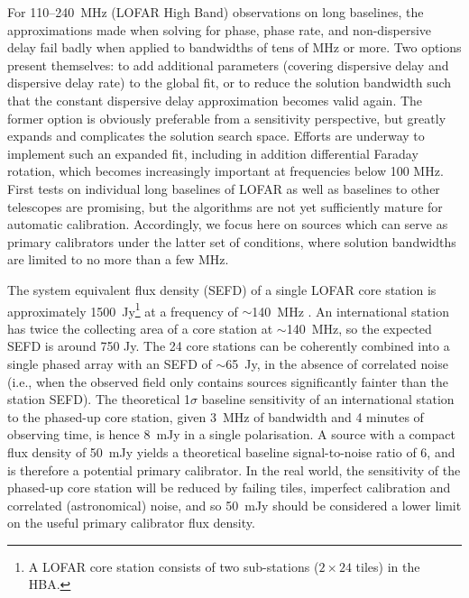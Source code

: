 \documentclass[graybox]{svmult}
\begin{document}
For 110--240~MHz (LOFAR High Band) observations on long baselines, the
approximations made when solving for phase, phase rate, and non-dispersive delay
fail badly when applied to bandwidths of tens of MHz or more.  Two options
present themselves: to add additional parameters (covering dispersive delay and
dispersive delay rate) to the global fit, or to reduce the solution bandwidth
such that the constant dispersive delay approximation becomes valid again.  The
former option is obviously preferable from a sensitivity perspective, but
greatly expands and complicates the solution search space.  Efforts are underway
to implement such an expanded fit, including in addition differential Faraday
rotation, which becomes increasingly important at frequencies below 100 MHz.
First tests on individual long baselines of LOFAR as well as baselines to other
telescopes are promising, but the algorithms are not yet sufficiently mature for
automatic calibration.  Accordingly, we focus here on sources which can serve as
primary calibrators under the latter set of conditions, where solution
bandwidths are limited to no more than a few MHz.

The system equivalent flux density (SEFD) of a single LOFAR core station is
approximately 1500~Jy\footnote{A LOFAR core station consists of two sub-stations
($2\times24$ tiles) in the HBA.} at a frequency of $\sim$140~MHz
\citep{vanhaarlem13}.  An international station has twice the collecting area
of a core station at $\sim$140~MHz, so the expected SEFD is around 750 Jy.  The
24 core stations can be coherently combined into a single phased array with an
SEFD of $\sim$65~Jy, in the absence of correlated noise (i.e., when the observed
field only contains sources significantly fainter than the station SEFD).  The
theoretical 1$\sigma$ baseline sensitivity of an international station to the
phased-up core station, given 3~MHz of bandwidth and 4 minutes of observing
time, is hence 8~mJy in a single polarisation.  A source with a compact flux
density of 50~mJy yields a theoretical baseline signal-to-noise ratio of 6, and
is therefore a potential primary calibrator. In the real world, the sensitivity
of the phased-up core station will be reduced by failing tiles, imperfect
calibration and correlated (astronomical) noise, and so 50~mJy should be
considered a lower limit on the useful primary calibrator flux density.
\end{document}
